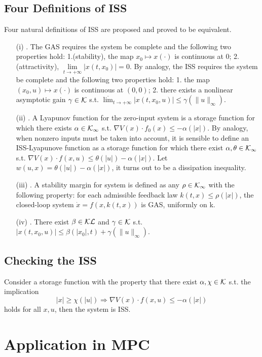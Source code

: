 \documentclass{paper}
\begin{document}
\subsection{Four Definitions of ISS}
Four natural definitions of ISS are proposed and proved to be  equivalent.
\begin{enumerate}
\item[(i)] . The GAS requires the system be complete and the following two properties hold: 1.(stability),
the map $x_0\longmapsto x(\cdot)$ is continuous at 0; 2.(attractivity), $\lim\limits_{t\rightarrow +\infty}|x(t,x_0)|=0$. By
analogy, the ISS requires the system be complete and the following two properties hold: 1. the map $(x_0,u)\longmapsto x(\cdot)$
is continuous at $(0,0)$; 2. there exists a nonlinear asymptotic gain $\gamma\in\mathcal{K}$ s.t. $\overline{\lim}_{t\rightarrow
+\infty}|x(t,x_0,u)|\leqslant\gamma(\|u\|_\infty)$.
\item[(ii)] . A Lyapunov function for the zero-input system is a storage function for which there
exists $\alpha\in\mathcal{K}_\infty$ s.t. $\nabla V(x)\cdot f_0(x)\leqslant-\alpha(|x|)$. By analogy, when nonzero inputs must be taken into
account, it is sensible to define an ISS-Lyapunove function as a storage function for which there exist $\alpha,\theta\in\mathcal{K}_\infty$ 
s.t. $\nabla V(x)\cdot f(x,u)\leqslant\theta(|u|)-\alpha(|x|)$. Let $w(u,x)=\theta(|u|)-\alpha(|x|)$, it turns out to be a
dissipation inequality.
\item[(iii)] . A stability margin for system is defined as any $\rho\in\mathcal{K}_\infty$ with the following property: for 
each admissible feedback law $k(t,x)\leqslant \rho(|x|)$, the closed-loop system $\dot{x}=f(x,k(t,x))$ is GAS, uniformly on k.
\item[(iv)] . There exist $\beta\in\mathcal{KL}$ and $\gamma\in\mathcal{K}$ s.t. $|x(t,x_0,u)|\leqslant\beta(|x_0|,t)+\gamma(\|u\|_\infty)$.
\end{enumerate}
\subsection{Checking the ISS}
\begin{thm}
Consider a storage function with the property that there exist $\alpha,\chi\in\mathcal{K}$ s.t. the implication 
\begin{equation}
|x|\geqslant\chi(|u|)\Rightarrow\nabla V(x)\cdot f(x,u)\leqslant-\alpha(|x|)
\end{equation}
holds for all $x,u$, then the system is ISS.
\end{thm}

\section{Application in MPC}


 
\end{document}
